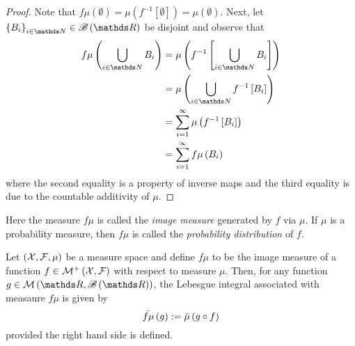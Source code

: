 \begin{proof}
Note that $f\mu\left(\emptyset\right)=\mu\left(f^{-1}\left[\emptyset\right]\right)=\mu\left(\emptyset\right).$
Next, let $\left\{ B_{i}\right\} _{i\in\N}\in\borel\left(\R\right)$
be disjoint and observe that
\begin{align*}
f\mu\left(\bigcup_{i\in\N}B_{i}\right) & =\mu\left(f^{-1}\left[\bigcup_{i\in\N}B_{i}\right]\right)\\
 & =\mu\left(\bigcup_{i\in\N}f^{-1}\left[B_{i}\right]\right)\\
 & =\sum_{i=1}^{\infty}\mu\left(f^{-1}\left[B_{i}\right]\right)\\
 & =\sum_{i=1}^{\infty}f\mu\left(B_{i}\right)
\end{align*}
where the second equality is a property of inverse maps and the third
equality is due to the countable additivity of $\mu$.
\end{proof}
\begin{rem*}
Here the measure $f\mu$ is called the \emph{image measure }generated
by $f$ via $\mu.$ If $\mu$ is a probability measure, then $f\mu$
is called the \emph{probability distribution }of $f$.
\end{rem*}
\begin{cor}
\label{cor:changeOfVariables}Let $\left(\mathcal{X},\mathcal{F},\mu\right)$ be a measure
space and define $f\mu$ to be the image measure of a function $f\in\mathcal{M}^{+}\left(\mathcal{X},\mathcal{F}\right)$
with respect to measure $\mu.$ Then, for any function $g\in\mathcal{M}\left(\R,\borel\left(\R\right)\right)$,
the Lebesgue integral associated with measaure $f\mu$ is given by
\[
\bar{f\mu}\left(g\right):=\bar{\mu}\left(g\circ f\right)
\]
provided the right hand side is defined.
\end{cor}

